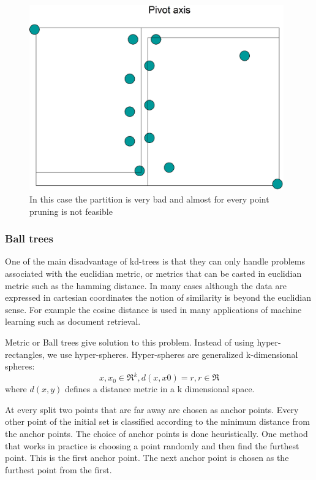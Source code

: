 \documentclass[12pt,letterpaper,doublespaced,ETD,dvips,proposal]{gtthesis}
\begin{document}
\begin{Body}
\begin{figure}[!htb]
\label{pathological_kd_tree}
\centerline{\includegraphics[height=8cm]{pathological_kd_tree.eps}}
\caption{In this case the partition is very bad and almost for every point pruning is not
feasible}
\end{figure}




\subsubsection{Ball trees}
One of the main disadvantage of kd-trees is that they can only
handle problems associated with the euclidian metric, or metrics
that can be casted in euclidian metric such as the hamming distance.
In many cases although the data are expressed in cartesian
coordinates the notion of similarity is beyond the euclidian sense.
For example the cosine distance is used in many applications of
machine learning such as document retrieval.

Metric or Ball trees \cite{moore2000ahu} give solution to this problem. Instead of using
hyper-rectangles, we use hyper-spheres. Hyper-spheres are
generalized k-dimensional spheres:
\begin{equation}
x,x_0 \in \Re^k , d(x,x0)=r, r\in \Re
\end{equation}
where $d(x, y)$ defines a distance metric in a k dimensional space.

At every split two points that are far away are chosen as anchor
points. Every other point of the initial set is classified according
to the minimum distance from the anchor points. The choice of anchor
points is done heuristically. One method that works in practice is
choosing a point randomly and then find the furthest point. This is
the first anchor point. The next anchor point is chosen as the
furthest point from the first.


\end{Body}
\end{document}
